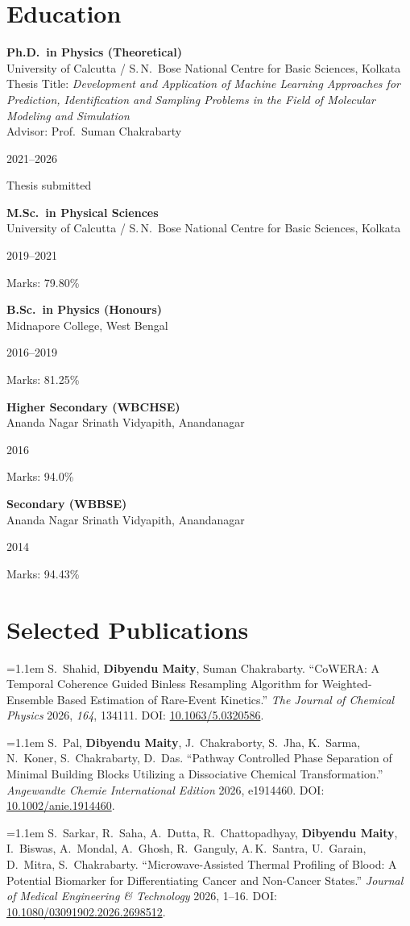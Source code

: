 \documentclass[10pt,a4paper]{article}
\newcommand{\pubentry}[1]{%
  \par\noindent\hangindent=1.1em\hangafter=1 #1\par\vspace{5pt}%
}
\newcommand{\me}{\textbf{Dibyendu Maity}}
\newcommand{\eduentry}[4]{%
  \noindent
  \begin{minipage}[t]{0.76\textwidth}
    {\headingfont\bfseries\color{charcoal}#1}\\[-1pt]
    {\small\color{charcoal}#2}
  \end{minipage}%
  \hfill
  \begin{minipage}[t]{0.20\textwidth}
    \raggedleft\headingfont\small\color{muted}#3
  \end{minipage}\par
  {\small\color{muted}#4}\par\vspace{6pt}
}
\begin{document}
\section{Education}

\eduentry{Ph.D.\ in Physics (Theoretical)}
{University of Calcutta / S.\,N.\ Bose National Centre for Basic Sciences, Kolkata\\
  Thesis Title: \textit{Development and Application of Machine Learning Approaches for Prediction,
    Identification and Sampling Problems in the Field of Molecular Modeling and Simulation}\\
  Advisor: Prof.\ Suman Chakrabarty}
{2021--2026}
{Thesis submitted}

\eduentry{M.Sc.\ in Physical Sciences}
{University of Calcutta / S.\,N.\ Bose National Centre for Basic Sciences, Kolkata}
{2019--2021}
{Marks: 79.80\%}

\eduentry{B.Sc.\ in Physics (Honours)}
{Midnapore College, West Bengal}
{2016--2019}
{Marks: 81.25\%}

{\small
  \color{muted}
  \eduentry{Higher Secondary (WBCHSE)}
  {Ananda Nagar Srinath Vidyapith, Anandanagar}
  {2016}
  {Marks: 94.0\%}

  \eduentry{Secondary (WBBSE)}
  {Ananda Nagar Srinath Vidyapith, Anandanagar}
  {2014}
  {Marks: 94.43\%}
}

\section{Selected Publications}
\smallskip

\pubentry{S.\ Shahid, \me, Suman Chakrabarty. ``CoWERA: A Temporal Coherence Guided Binless
  Resampling Algorithm for Weighted-Ensemble Based Estimation of Rare-Event Kinetics.''
  \textit{The Journal of Chemical Physics} 2026, \textit{164}, 134111.
  DOI: \href{https://doi.org/10.1063/5.0320586}{10.1063/5.0320586}.}

\pubentry{S.\ Pal, \me, J.\ Chakraborty, S.\ Jha, K.\ Sarma, N.\ Koner, S.\ Chakrabarty, D.\ Das.
  ``Pathway Controlled Phase Separation of Minimal Building Blocks Utilizing a Dissociative
  Chemical Transformation.'' \textit{Angewandte Chemie International Edition} 2026, e1914460.
  DOI: \href{https://doi.org/10.1002/anie.1914460}{10.1002/anie.1914460}.}

\pubentry{S.\ Sarkar, R.\ Saha, A.\ Dutta, R.\ Chattopadhyay, \me, I.\ Biswas, A.\ Mondal,
  A.\ Ghosh, R.\ Ganguly, A.\,K.\ Santra, U.\ Garain, D.\ Mitra, S.\ Chakrabarty.
  ``Microwave-Assisted Thermal Profiling of Blood: A Potential Biomarker for Differentiating
  Cancer and Non-Cancer States.'' \textit{Journal of Medical Engineering \& Technology} 2026,
  1--16. DOI: \href{https://doi.org/10.1080/03091902.2026.2698512}{10.1080/03091902.2026.2698512}.}
\end{document}
